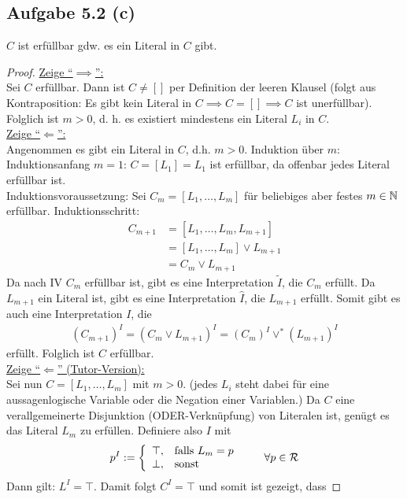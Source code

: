 \documentclass[12pt,a4paper]{article}
\newcommand{\RR}{\mathcal{R}}
\begin{document}
\subsection*{Aufgabe 5.2 (c)}
$C$ ist erfüllbar gdw. es ein Literal in $C$ gibt.
\begin{proof}
\underline{Zeige ``$\implies$'':}\\
Sei $C$ erfüllbar. Dann ist $C\neq[]$ per Definition der leeren Klausel (folgt aus Kontraposition: Es gibt kein Literal in $C\implies C=[]\implies C$ ist unerfüllbar). Folglich ist $m>0$, d. h. es existiert mindestens ein Literal $L_i$ in $C$.\\

\underline{Zeige ``$\Longleftarrow$'':}\\
Angenommen es gibt ein Literal in $C$, d.h. $m>0$.
Induktion über $m$:\\
Induktionsanfang $m=1$: $C=[L_1]=L_1$ ist erfüllbar, da offenbar jedes Literal erfüllbar ist.\\
Induktionsvoraussetzung: Sei $C_m=[L_1,\ldots,L_m]$ für beliebiges aber festes $m\in\mathbb{N}$ erfüllbar.
Induktionsschritt: 
\begin{align*}
C_{m+1}
&=[L_1,\ldots,L_m,L_{m+1}]\\
&=[L_1,\ldots,L_m]\vee L_{m+1}\\
&= C_{m}\vee L_{m+1}
\end{align*}
Da nach IV $C_m$ erfüllbar ist, gibt es eine Interpretation $\tilde{I}$, die $C_m$ erfüllt. Da $L_{m+1}$ ein Literal ist, gibt es eine Interpretation $\hat{I}$, die $L_{m+1}$ erfüllt. Somit gibt es auch eine Interpretation $I$, die 
\begin{align*}
(C_{m+1})^I=(C_{m}\vee L_{m+1})^I=(C_{m})^I\vee^\ast (L_{m+1})^I
\end{align*}
erfüllt. Folglich ist $C$ erfüllbar.\\

\underline{Zeige ``$\Longleftarrow$'' (Tutor-Version):}\\
Sei nun $C=[L_1,\ldots,L_m]$ mit $m>0$. (jedes $L_i$ steht dabei für eine aussagenlogische Variable oder die Negation einer Variablen.) Da $C$ eine verallgemeinerte Disjunktion (ODER-Verknüpfung) von Literalen ist, genügt es das Literal $L_m$ zu erfüllen. Definiere also $I$ mit
\begin{align*}
p^I:=\left\lbrace\begin{array}{cl}
\top,&\falls L_m=p\\
\bot,&\sonst
\end{array}\right.\qquad\forall p\in\RR
\end{align*}
Dann gilt: $L^I=\top$. Damit folgt $C^I=\top$ und somit ist gezeigt, dass

\end{proof}
\end{document}
